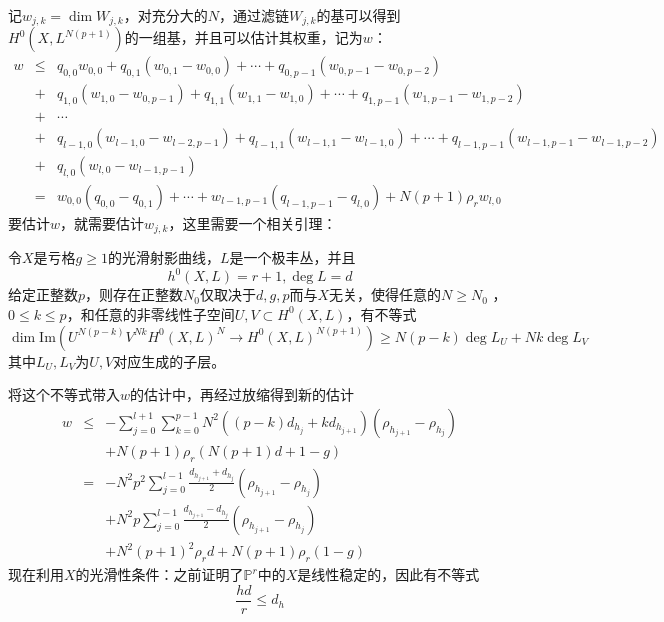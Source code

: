 记$ w_{j,k}=\dim W_{j,k} $，对充分大的$ N $，通过滤链$ W_{j,k} $的基可以得到$ H^0(X,L^{N(p+1)}) $的一组基，并且可以估计其权重，记为$ w $：
\begin{equation*}
\begin{array}{rcl}
w&\leqslant& q_{0,0}w_{0,0}+ q_{0,1}(w_{0,1}-w_{0,0})+\cdots + q_{0,p-1}(w_{0,p-1}-w_{0,p-2})\\
&+ &q_{1,0}(w_{1,0}-w_{0,p-1})+ q_{1,1}(w_{1,1}-w_{1,0})+\cdots + q_{1,p-1}(w_{1,p-1}-w_{1,p-2})\\
&+&\cdots\\
&+&q_{l-1,0}(w_{l-1,0}-w_{l-2,p-1})+ q_{l-1,1}(w_{l-1,1}-w_{l-1,0})+\cdots + q_{l-1,p-1}(w_{l-1,p-1}-w_{l-1,p-2})\\
&+ &q_{l,0}(w_{l,0}-w_{l-1,p-1})\\
&=&w_{0,0}(q_{0,0}-q_{0,1})+\cdots+w_{l-1,p-1}(q_{l-1,p-1}-q_{l,0})+N(p+1)\rho_rw_{l,0}
\end{array}
\end{equation*}
要估计$ w $，就需要估计$ w_{j,k} $，这里需要一个相关引理：
\begin{lemma}[\cite{GeometryAlgCurvesII}\uppercase\expandafter{\romannumeral14}.Lemma3.3]
	令$ X $是亏格$ g\geqslant1 $的光滑射影曲线，$ L $是一个极丰丛，并且
	$$ h^0(X,L)=r+1 ,\deg L=d$$
	给定正整数$ p $，则存在正整数$ N_0 $仅取决于$ d,g,p $而与$ X $无关，使得任意的$ N\geqslant N_0$ ， $0\leqslant k \leqslant p $，和任意的非零线性子空间$ U,V\subset H^0(X,L) $，有不等式
	$$ \dim \mathrm{Im}\left( U^{N(p-k)}V^{Nk}H^0(X,L)^N\to H^0(X,L)^{N(p+1)}  \right)\geqslant N(p-k)\deg L_U+Nk\deg L_V  $$	
	其中$ L_U,L_V $为$ U,V $对应生成的子层。
\end{lemma}
将这个不等式带入$ w $的估计中，再经过放缩得到新的估计
\begin{equation*}
\begin{array}{rcl}
w&\leqslant&-\sum_{j=0}^{l+1}\sum_{k=0}^{p-1}N^2((p-k)d_{h_j}+kd_{h_{j+1}})(\rho_{h_{j+1}}-\rho_{h_j})\\
&&+N(p+1)\rho_r( N(p+1)d+1-g  )\\
&=&-N^2p^2\sum_{j=0}^{l-1}\frac{    d_{h_{j+1}}+ d_{h_j}   }{2}(\rho_{h_{j+1}}-\rho_{h_j})\\
&&+N^2p\sum_{j=0}^{l-1}\frac{  d_{h_{j+1}} -  d_{h_j}  }{2}(\rho_{h_{j+1}}-\rho_{h_j})\\
&&+N^2(p+1)^2\rho_rd+N(p+1)\rho_r(1-g)
\end{array}
\end{equation*}
现在利用$ X $的光滑性条件：之前证明了$ \mathbb{P}^r $中的$ X $是线性稳定的，因此有不等式
$$ \frac{hd}{r}\leqslant d_h $$
